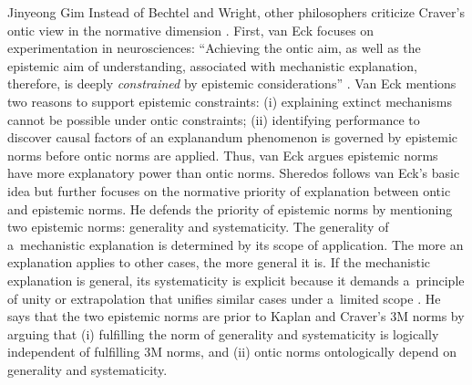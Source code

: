 \begin{artengenv}{Jinyeong Gim}
Instead of Bechtel and Wright, other philosophers criticize Craver's ontic view in the normative dimension
\parencites[][]{van_eck_reconciling_2015}[][]{sheredos_re-reconciling_2016}. %
 First, van Eck 
\parencite*[][]{van_eck_reconciling_2015} %
 focuses on experimentation in neurosciences: ``Achieving the ontic aim, as well as the epistemic aim of understanding, associated with mechanistic explanation, therefore, is deeply \textit{constrained} by epistemic considerations'' 
\parencite[][emphasis added]{van_eck_reconciling_2015}. %
 Van Eck mentions two reasons to support epistemic constraints: (i) explaining extinct mechanisms cannot be possible under ontic constraints; (ii) identifying performance to discover causal factors of an explanandum phenomenon is governed by epistemic norms before ontic norms are applied. Thus, van Eck argues epistemic norms have more explanatory power than ontic norms. Sheredos follows van Eck's basic idea but further focuses on the normative priority of explanation between ontic and epistemic norms. He defends the priority of epistemic norms by mentioning two epistemic norms: generality and systematicity. The generality of a~mechanistic explanation is determined by its scope of application. The more an explanation applies to other cases, the more general it is. If the mechanistic explanation is general, its systematicity is explicit because it demands a~principle of unity or extrapolation that unifies similar cases under a~limited scope 
\parencite[][p.932]{sheredos_re-reconciling_2016}. %
 He says that the two epistemic norms are prior to Kaplan and Craver's 3M norms by arguing that (i) fulfilling the norm of generality and systematicity is logically independent of fulfilling 3M norms, and (ii) ontic norms ontologically depend on generality and systematicity.


\end{artengenv}
